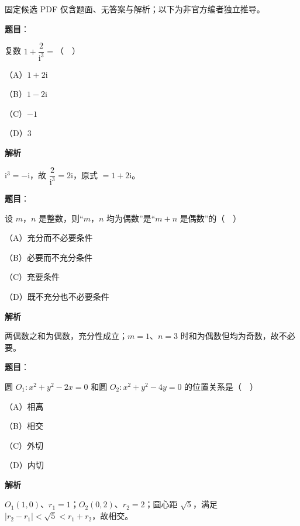 

\begin{gktip}
固定候选 PDF 仅含题面、无答案与解析；以下为非官方编者独立推导。
\end{gktip}

\begin{answer}

\textbf{题目}：

复数 $1+\dfrac2{\mathrm i^3}=$（　）

（A）$1+2\mathrm i$

（B）$1-2\mathrm i$

（C）$-1$

（D）$3$

\textbf{解析}

$\mathrm i^3=-\mathrm i$，故 $\dfrac2{\mathrm i^3}=2\mathrm i$，原式 $=1+2\mathrm i$。


\end{answer}
\begin{answer}

\textbf{题目}：

设 $m$，$n$ 是整数，则“$m$，$n$ 均为偶数”是“$m+n$ 是偶数”的（　）

（A）充分而不必要条件

（B）必要而不充分条件

（C）充要条件

（D）既不充分也不必要条件

\textbf{解析}

两偶数之和为偶数，充分性成立；$m=1$、$n=3$ 时和为偶数但均为奇数，故不必要。


\end{answer}
\begin{answer}

\textbf{题目}：

圆 $O_1:x^2+y^2-2x=0$ 和圆 $O_2:x^2+y^2-4y=0$ 的位置关系是（　）

（A）相离

（B）相交

（C）外切

（D）内切

\textbf{解析}

$O_1(1,0)$、$r_1=1$；$O_2(0,2)$、$r_2=2$；圆心距 $\sqrt5$，满足 $|r_2-r_1|<\sqrt5<r_1+r_2$，故相交。


\end{answer}
